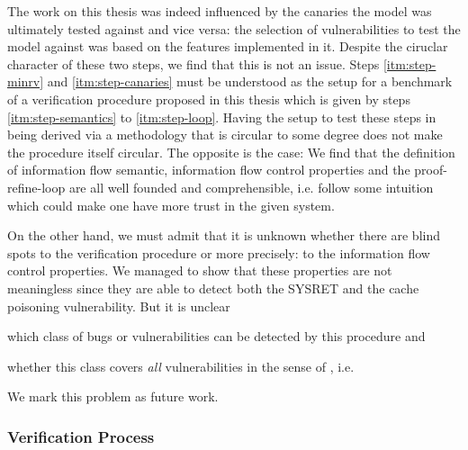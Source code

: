 The work on this thesis was indeed influenced by the canaries the model was ultimately tested against and vice versa: the selection of vulnerabilities to test the model against was based on the features implemented in it.
Despite the ciruclar character of these two steps, we find that this is not an issue.
Steps \ref{itm:step-minrv} and \ref{itm:step-canaries} must be understood as the setup for a benchmark of a verification procedure proposed in this thesis which is given by steps \ref{itm:step-semantics} to \ref{itm:step-loop}.
Having the setup to test these steps in being derived via a methodology that is circular to some degree does not make the procedure itself circular.
The opposite is the case:
We find that the definition of information flow semantic, information flow control properties and the proof-refine-loop are all well founded and comprehensible, i.e. follow some intuition which could make one have more trust in the given system.

On the other hand, we must admit that it is unknown whether there are blind spots to the verification procedure or more precisely: to the information flow control properties.
We managed to show that these properties are not meaningless since they are able to detect both the SYSRET and the cache poisoning vulnerability.
But it is unclear
\begin{enumerate*}[label=\alph*)]
    \item which class of bugs or vulnerabilities can be detected by this procedure and
    \item whether this class covers \textit{all} vulnerabilities in the sense of \citeauthor{Piano}, i.e. 
\end{enumerate*}
We mark this problem as future work.

\subsubsection{Verification Process}
